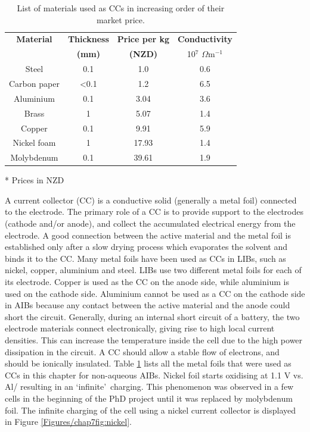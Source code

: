 \begin{table}
\centering
\begin{threeparttable}
\caption{List of materials used as CCs in increasing order of their market price.} \label{t2}
 \begin{tabular}{|c|c|c|c|} 
\hline
\textbf{Material} & \textbf{Thickness} & \textbf{Price per kg} & \textbf{Conductivity} \\
 & \textbf{(mm)} & \textbf{(NZD)} & {10$^{7}$} {$\Omega$}m$^{-1}$ \\
\hline
Steel & 0.1 & 1.0 & 0.6 \\ 
Carbon paper & <0.1 & 1.2 & 6.5 \\
Aluminium & 0.1 & 3.04 & 3.6 \\
Brass & 1 & 5.07 & 1.4 \\
Copper & 0.1 & 9.91 & 5.9 \\ 
Nickel foam & 1 & 17.93 & 1.4 \\
Molybdenum & 0.1 & 39.61 & 1.9 \\
\hline
\end{tabular}
\begin{tablenotes}
\item [*] Prices in NZD
\end{tablenotes}
\end{threeparttable}
\end{table}
A current collector (CC) is a conductive solid (generally a metal foil) connected to the electrode. The primary role of a CC is to provide support to the electrodes (cathode and/or anode), and collect the accumulated electrical energy from the electrode. A good connection between the active material and the metal foil is established only after a slow drying process which evaporates the solvent and binds it to the CC. Many metal foils have been used as CCs in LIBs, such as nickel, copper, aluminium and steel. LIBs use two different metal foils for each of its electrode. Copper is used as the CC on the anode side, while aluminium is used on the cathode side. Aluminium cannot be used as a CC on the cathode side in AIBs because any contact between the active material and the anode could short the circuit. Generally, during an internal short circuit of a battery, the two electrode materials connect electronically, giving rise to high local current densities. This can increase the temperature inside the cell due to the high power dissipation in the circuit. A CC should allow a stable flow of electrons, and should be ionically insulated. Table \ref{t2} lists all the metal foils that were used as CCs in this chapter for non-aqueous AIBs. Nickel foil starts oxidising at 1.1 V vs. Al/ resulting in an \lq infinite\rq\ charging. This phenomenon was observed in a few cells in the beginning of the PhD project until it was replaced by molybdenum foil. The infinite charging of the cell using a nickel current collector is displayed in Figure \ref{Figures/chap7fig:nickel}. 
